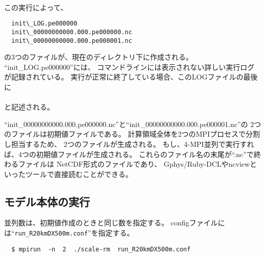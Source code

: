 \\

\noindent この実行によって、\\
\begin{verbatim}
  init\_LOG.pe000000
  init\_00000000000.000.pe000000.nc
  init\_00000000000.000.pe000001.nc
\end{verbatim}
の3つのファイルが、現在のディレクトリ下に作成される。
``init\_LOG.pe000000''には、
コマンドラインには表示されない詳しい実行ログが記録されている。
実行が正常に終了している場合、このLOGファイルの最後に\\

\\

\noindent と記述される。

``init\_00000000000.000.pe000000.nc''と``init\_00000000000.000.pe000001.nc''の
2つのファイルは初期値ファイルである。
計算領域全体を2つのMPIプロセスで分割し担当するため、
2つのファイルが生成される。
もし、4-MPI並列で実行すれば、4つの初期値ファイルが生成される。
これらのファイル名の末尾が``.nc''で終わるファイルは
NetCDF形式のファイルであり、
Gphys/Ruby-DCLやncviewといったツールで直接読むことができる。


\subsection{モデル本体の実行}
並列数は、初期値作成のときと同じ数を指定する。
configファイルには``\verb|run_R20kmDX500m.conf|''を指定する。
\begin{verbatim}
  $ mpirun  -n  2  ./scale-rm  run_R20kmDX500m.conf
\end{verbatim}

